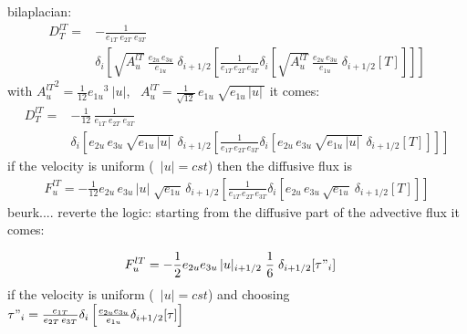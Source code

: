 \documentclass[../main/NEMO_manual]{subfiles}
\begin{document}
bilaplacian:
\begin{equation}
  \label{eq:ALGOS_tra_ldf_lap}
  \begin{split}
    D_T^{lT} =&-\frac{1}{e_{1T} \; e_{2T}\;  e_{3T}} \\
    & \delta_i \left[  \sqrt{A_u^{lT}}\ \frac{e_{2u}\,e_{3u}}{e_{1u}}\;\delta_{i+1/2}
      \left[ \frac{1}{e_{1T}\,e_{2T}\, e_{3T}}
        \delta_i \left[ \sqrt{A_u^{lT}}\ \frac{e_{2u}\,e_{3u}}{e_{1u}}\;\delta_{i+1/2}
          [T] \right] \right] \right]
  \end{split}
\end{equation}
with ${A_u^{lT}}^2 = \frac{1}{12} {e_{1u}}^3\ |u|$,
\ie\ $A_u^{lT} = \frac{1}{\sqrt{12}} \,e_{1u}\ \sqrt{ e_{1u}\,|u|\,}$
it comes:
\begin{equation}
  \label{eq:ALGOS_tra_ldf_lap}
  \begin{split}
    D_T^{lT} =&-\frac{1}{12}\,\frac{1}{e_{1T} \; e_{2T}\;  e_{3T}} \\
    & \delta_i \left[ e_{2u}\,e_{3u}\,\sqrt{ e_{1u}\,|u|\,}\;\delta_{i+1/2}
      \left[ \frac{1}{e_{1T}\,e_{2T}\, e_{3T}}
        \delta_i \left[ e_{2u}\,e_{3u}\,\sqrt{ e_{1u}\,|u|\,}\;\delta_{i+1/2}
          [T] \right] \right] \right]
  \end{split}
\end{equation}
if the velocity is uniform (\ie\ $|u|=cst$) then the diffusive flux is
\begin{equation}
  \label{eq:ALGOS_tra_ldf_lap}
  \begin{split}
    F_u^{lT} = - \frac{1}{12}
    e_{2u}\,e_{3u}\,|u| \;\sqrt{ e_{1u}}\,\delta_{i+1/2}
    \left[ \frac{1}{e_{1T}\,e_{2T}\, e_{3T}}
      \delta_i \left[ e_{2u}\,e_{3u}\,\sqrt{ e_{1u}}\:\delta_{i+1/2}
        [T] \right] \right]
  \end{split}
\end{equation}
beurk....  reverte the logic: starting from the diffusive part of the advective flux it comes:

\begin{equation}
  \label{eq:ALGOS_tra_adv_ubs2}
  \begin{split}
    F_u^{lT} &= - \frac{1}{2} e_{2u} e_{3u}\,|u|_{i+1/2} \;\frac{1}{6} \;\delta_{i+1/2}[\tau"_i]
  \end{split}
\end{equation}
if the velocity is uniform (\ie\ $|u|=cst$) and
choosing $\tau "_i =\frac{e_{1T}}{e_{2T}\,e_{3T}}\delta_i \left[ \frac{e_{2u} e_{3u} }{e_{1u} } \delta_{i+1/2}[\tau] \right]$
\end{document}
